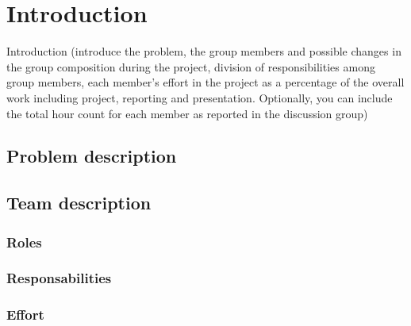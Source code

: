 \chapter{Introduction}
Introduction (introduce the problem, the group members and possible changes in the group composition during the project, division of responsibilities among group members, each member's effort in the project as a percentage of the overall work including project, reporting and presentation. Optionally, you can include the total hour count for each member as reported in the discussion group)

\section{Problem description}

\section{Team description}

\subsection{Roles}

\subsection{Responsabilities}

\subsection{Effort}

